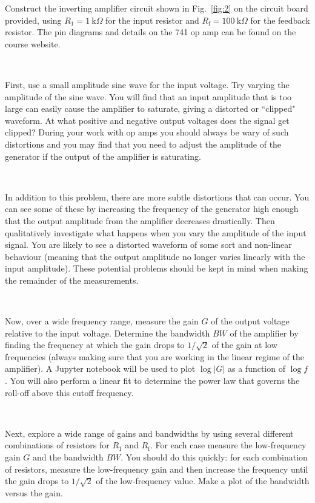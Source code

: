 \documentclass[12pt,oneside,openany,letterpaper]{article}
\begin{document}
\noindent Construct the inverting amplifier circuit shown in Fig.~\ref{fig:2} on the circuit board provided, using $R_1=1~\mathrm{k}\Omega$ for the input resistor and $R_\mathrm{f} = 100~\mathrm{k}\Omega$ for the feedback resistor. The pin diagrams and details on the 741 op amp can be found on the course website.  

~

\noindent First, use a small amplitude sine wave for the input voltage. Try varying the amplitude of the sine wave. You will find that an input amplitude that is too large can easily cause the amplifier to saturate, giving a distorted or ``clipped" waveform.  At what positive and negative output voltages does the signal get clipped? During your work with op amps you should always be wary of such distortions and you may find that you need to adjust the amplitude of the generator if the output of the amplifier is saturating.

~

\noindent In addition to this problem, there are more subtle distortions that can occur. You can see some of these by increasing the frequency of the generator high enough that the output amplitude from the amplifier decreases drastically. Then qualitatively investigate what happens when you vary the amplitude of the input signal. You are likely to see a distorted waveform of some sort and non-linear behaviour (meaning that the output amplitude no longer varies linearly with the input amplitude). These potential problems should be kept in mind when making the remainder of the measurements.

~

\noindent Now, over a wide frequency range, measure the gain $G$ of the output voltage relative to the input voltage. Determine the bandwidth $BW$ of the amplifier by finding the frequency at which the gain drops to $1/\sqrt{2}$ of the gain at low frequencies (always making sure that you are working in the linear regime of the amplifier). A Jupyter notebook will be used to plot $\log\left\vert G\right\vert$ as a function of $\log f$.  You will also perform a linear fit to determine the power law that governs the roll-off above this cutoff frequency.

~

\noindent Next, explore a wide range of gains and bandwidths by using several different combinations of resistors for $R_1$ and $R_\mathrm{f}$. For each case measure the low-frequency gain $G$ and the bandwidth $BW$. You should do this quickly: for each combination of resistors, measure the low-frequency gain and then increase the frequency until the gain drops to $1/\sqrt{2}$ of the low-frequency value. Make a plot of the bandwidth versus the gain.
\end{document}
